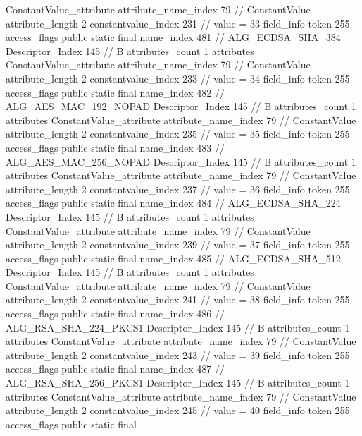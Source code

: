 {{{{{{				ConstantValue_attribute {
					attribute_name_index	79		// ConstantValue
					attribute_length	2
					constantvalue_index	231		// value = 33
				}
				}
			}
			field_info {
				token	255
				access_flags	public static final
				name_index	481		// ALG_ECDSA_SHA_384
				Descriptor_Index	145		// B
				attributes_count	1
				attributes {
				ConstantValue_attribute {
					attribute_name_index	79		// ConstantValue
					attribute_length	2
					constantvalue_index	233		// value = 34
				}
				}
			}
			field_info {
				token	255
				access_flags	public static final
				name_index	482		// ALG_AES_MAC_192_NOPAD
				Descriptor_Index	145		// B
				attributes_count	1
				attributes {
				ConstantValue_attribute {
					attribute_name_index	79		// ConstantValue
					attribute_length	2
					constantvalue_index	235		// value = 35
				}
				}
			}
			field_info {
				token	255
				access_flags	public static final
				name_index	483		// ALG_AES_MAC_256_NOPAD
				Descriptor_Index	145		// B
				attributes_count	1
				attributes {
				ConstantValue_attribute {
					attribute_name_index	79		// ConstantValue
					attribute_length	2
					constantvalue_index	237		// value = 36
				}
				}
			}
			field_info {
				token	255
				access_flags	public static final
				name_index	484		// ALG_ECDSA_SHA_224
				Descriptor_Index	145		// B
				attributes_count	1
				attributes {
				ConstantValue_attribute {
					attribute_name_index	79		// ConstantValue
					attribute_length	2
					constantvalue_index	239		// value = 37
				}
				}
			}
			field_info {
				token	255
				access_flags	public static final
				name_index	485		// ALG_ECDSA_SHA_512
				Descriptor_Index	145		// B
				attributes_count	1
				attributes {
				ConstantValue_attribute {
					attribute_name_index	79		// ConstantValue
					attribute_length	2
					constantvalue_index	241		// value = 38
				}
				}
			}
			field_info {
				token	255
				access_flags	public static final
				name_index	486		// ALG_RSA_SHA_224_PKCS1
				Descriptor_Index	145		// B
				attributes_count	1
				attributes {
				ConstantValue_attribute {
					attribute_name_index	79		// ConstantValue
					attribute_length	2
					constantvalue_index	243		// value = 39
				}
				}
			}
			field_info {
				token	255
				access_flags	public static final
				name_index	487		// ALG_RSA_SHA_256_PKCS1
				Descriptor_Index	145		// B
				attributes_count	1
				attributes {
				ConstantValue_attribute {
					attribute_name_index	79		// ConstantValue
					attribute_length	2
					constantvalue_index	245		// value = 40
				}
				}
			}
			field_info {
				token	255
				access_flags	public static final
}}}}}
